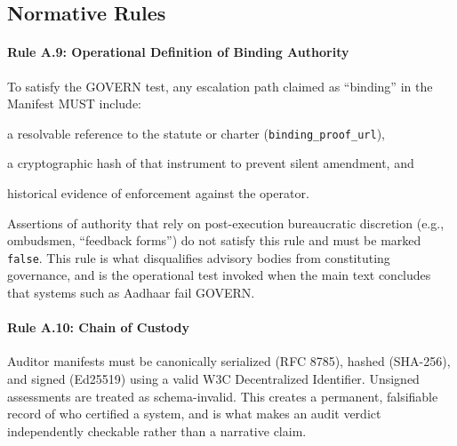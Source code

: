 \documentclass{article}
\begin{document}
\subsection{Normative Rules}

\paragraph{Rule A.9: Operational Definition of Binding Authority}
To satisfy the GOVERN test, any escalation path claimed as ``binding'' in the Manifest MUST include:
\begin{enumerate*}[label=(\roman*)]
    \item a resolvable reference to the statute or charter (\texttt{binding\_proof\_url}),
    \item a cryptographic hash of that instrument to prevent silent amendment, and
    \item historical evidence of enforcement against the operator.
\end{enumerate*}
Assertions of authority that rely on post-execution bureaucratic discretion (e.g., ombudsmen, ``feedback forms'') do not satisfy this rule and must be marked \texttt{false}. This rule is what disqualifies advisory bodies from constituting governance, and is the operational test invoked when the main text concludes that systems such as Aadhaar fail GOVERN.

\paragraph{Rule A.10: Chain of Custody}
Auditor manifests must be canonically serialized (RFC 8785), hashed (SHA-256), and signed (Ed25519) using a valid W3C Decentralized Identifier. Unsigned assessments are treated as schema-invalid. This creates a permanent, falsifiable record of who certified a system, and is what makes an audit verdict independently checkable rather than a narrative claim.
\end{document}
